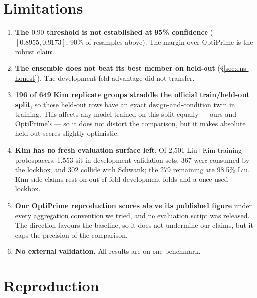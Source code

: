\documentclass[11pt]{article}
\begin{document}
\section{Limitations}

\begin{enumerate}
\item \textbf{The $0.90$ threshold is not established at 95\% confidence}
($[0.8955, 0.9173]$; 90\% of resamples above). The margin over OptiPrime is the robust
claim.
\item \textbf{The ensemble does not beat its best member on held-out}
(\S\ref{sec:ens-honest}). The development-fold advantage did not transfer.
\item \textbf{196 of 649 Kim replicate groups straddle the official train/held-out
split}, so those held-out rows have an exact design-and-condition twin in training.
This affects any model trained on this split equally --- ours and OptiPrime's --- so it
does not distort the comparison, but it makes absolute held-out scores slightly
optimistic.
\item \textbf{Kim has no fresh evaluation surface left.} Of 2{,}501 Liu+Kim training
protospacers, 1{,}553 sit in development validation sets, 367 were consumed by the
lockbox, and 302 collide with Schwank; the 279 remaining are 98.5\% Liu. Kim-side
claims rest on out-of-fold development folds and a once-used lockbox.
\item \textbf{Our OptiPrime reproduction scores above its published figure} under every
aggregation convention we tried, and no evaluation script was released. The direction
favours the baseline, so it does not undermine our claims, but it caps the precision of
the comparison.
\item \textbf{No external validation.} All results are on one benchmark.
\end{enumerate}

\section{Reproduction}
\end{document}
